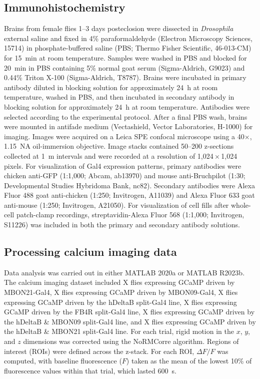 \subsection{Immunohistochemistry}

Brains from female flies 1--3 days posteclosion were dissected in \textit{Drosophila} external saline and fixed in 4\% paraformaldehyde (Electron Microscopy Sciences, 15714) in phosphate-buffered saline (PBS; Thermo Fisher Scientific, 46-013-CM) for 15~min at room temperature. Samples were washed in PBS and blocked for 20~min in PBS containing 5\% normal goat serum (Sigma-Aldrich, G9023) and 0.44\% Triton X-100 (Sigma-Aldrich, T8787). Brains were incubated in primary antibody diluted in blocking solution for approximately 24~h at room temperature, washed in PBS, and then incubated in secondary antibody in blocking solution for approximately 24~h at room temperature. Antibodies were selected according to the experimental protocol. After a final PBS wash, brains were mounted in antifade medium (Vectashield, Vector Laboratories, H-1000) for imaging. Images were acquired on a Leica SPE confocal microscope using a 40$\times$, 1.15~NA oil-immersion objective. Image stacks contained 50--200 z-sections collected at 1~\textmu m intervals and were recorded at a resolution of 1,024\,$\times$\,1,024 pixels. For visualization of Gal4 expression patterns, primary antibodies were chicken anti-GFP (1:1,000; Abcam, ab13970) and mouse anti-Bruchpilot (1:30; Developmental Studies Hybridoma Bank, nc82). Secondary antibodies were Alexa Fluor 488 goat anti-chicken (1:250; Invitrogen, A11039) and Alexa Fluor 633 goat anti-mouse (1:250; Invitrogen, A21050). For visualization of cell fills after whole-cell patch-clamp recordings, streptavidin-Alexa Fluor 568 (1:1,000; Invitrogen, S11226) was included in both the primary and secondary antibody solutions.

\subsection{Processing calcium imaging data}

Data analysis was carried out in either MATLAB 2020a or MATLAB R2023b. The calcium imaging dataset included X flies expressing GCaMP driven by MBON21-Gal4, X flies expressing GCaMP driven by MBON09-Gal4, X flies expressing GCaMP driven by the hDeltaB split-Gal4 line, X flies expressing GCaMP driven by the FB4R split-Gal4 line, X flies expressing GCaMP driven by the hDeltaB \& MBON09 split-Gal4 line, and X flies expressing GCaMP driven by the hDeltaB \& MBON21 split-Gal4 line. For each trial, rigid motion in the $x$, $y$, and $z$ dimensions was corrected using the NoRMCorre algorithm. Regions of interest (ROIs) were defined across the z-stack. For each ROI, $\Delta F/F$ was computed, with baseline fluorescence ($F$) taken as the mean of the lowest 10\% of fluorescence values within that trial, which lasted 600~s.


